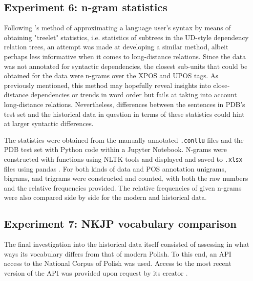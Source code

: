 \subsection{Experiment 6: n-gram statistics}
\label{subsec:ngrams}

Following \citet{johannsen-etal-2015-cross}'s method of approximating a language user's syntax by means of obtaining "treelet" statistics, i.e. statistics of subtrees in the UD-style dependency relation trees, an attempt was made at developing a similar method, albeit perhaps less informative when it comes to long-distance relations. Since the data was not annotated for syntactic dependencies, the closest sub-units that could be obtained for the data were n-grams over the XPOS and UPOS tags. As previously mentioned, this method may hopefully reveal insights into close-distance dependencies or trends in word order but fails at taking into account long-distance relations. Nevertheless, differences between the sentences in PDB's test set and the historical data in question in terms of these statistics could hint at larger syntactic differences.

The statistics were obtained from the manually annotated \texttt{.conllu} files and the PDB test set with Python code within a Jupyter Notebook. N-grams were constructed with functions using NLTK tools and displayed and saved to \texttt{.xlsx} files using pandas \citep{bird_loper_klein_2009, reback2020pandas, mckinney-proc-scipy-2010}. For both kinds of data and POS annotation unigrams, bigrams, and trigrams were constructed and counted, with both the raw numbers and the relative frequencies provided. The relative frequencies of given n-grams were also compared side by side for the modern and historical data.

\subsection{Experiment 7: NKJP vocabulary comparison}
\label{subsec:nkjp-vocab}

The final investigation into the historical data itself consisted of assessing in what ways its vocabulary differs from that of modern Polish. To this end, an API access to the National Corpus of Polish was used. Access to the most recent version of the API was provided upon request by its creator \citep{pęzik_2012}. 

